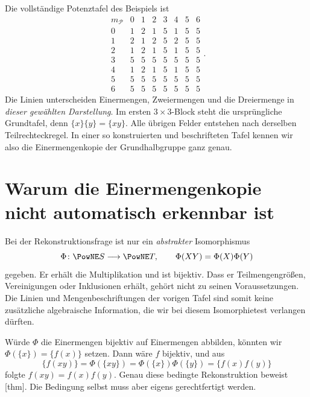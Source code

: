 Die vollständige Potenztafel des Beispiels ist
\[
  \begin{array}{c|ccc|ccc|c}
    m_{\mathcal P}&0&1&2&3&4&5&6\\\hline
    0&1&2&1&5&1&5&5\\
    1&2&1&2&5&2&5&5\\
    2&1&2&1&5&1&5&5\\\hline
    3&5&5&5&5&5&5&5\\
    4&1&2&1&5&1&5&5\\
    5&5&5&5&5&5&5&5\\\hline
    6&5&5&5&5&5&5&5
  \end{array}.
\]
Die Linien unterscheiden Einermengen, Zweiermengen und die Dreiermenge
in \emph{dieser gewählten Darstellung}. Im ersten
\(3\times3\)-Block steht die ursprüngliche Grundtafel, denn
\(\{x\}\{y\}=\{xy\}\). Alle übrigen Felder entstehen nach derselben
Teilrechteckregel. In einer so konstruierten und beschrifteten Tafel
kennen wir also die Einermengenkopie der Grundhalbgruppe ganz genau.

\section*{Warum die Einermengenkopie nicht automatisch erkennbar ist}
\hypertarget{finite-semigroups.reading.reconstruction}{}

Bei der Rekonstruktionsfrage ist nur ein \emph{abstrakter}
Isomorphismus
\[
  \Phi\colon\PowNE S\longrightarrow\PowNE T,\qquad
  \Phi(XY)=\Phi(X)\Phi(Y)
\]
gegeben. Er erhält die Multiplikation und ist bijektiv. Dass er
Teilmengengrößen, Vereinigungen oder Inklusionen erhält, gehört nicht
zu seinen Voraussetzungen. Die Linien und Mengenbeschriftungen der
vorigen Tafel sind somit keine zusätzliche algebraische Information,
die wir bei diesem Isomorphietest verlangen dürften.

Würde \(\Phi\) die Einermengen bijektiv auf Einermengen abbilden,
könnten wir \(\Phi(\{x\})=\{f(x)\}\) setzen. Dann wäre \(f\) bijektiv,
und aus
\[
  \{f(xy)\}=\Phi(\{xy\})
  =\Phi(\{x\})\Phi(\{y\})
  =\{f(x)f(y)\}
\]
folgte \(f(xy)=f(x)f(y)\). Genau diese bedingte Rekonstruktion
beweist [thm].
Die Bedingung selbst muss aber eigens gerechtfertigt werden.

